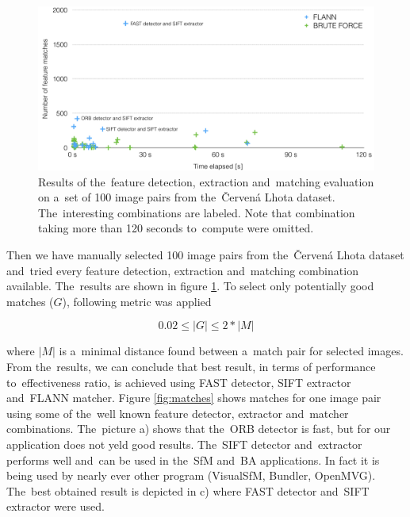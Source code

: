 \begin{figure}[!htbp]
	\begin{center}
		\includegraphics[keepaspectratio,width=\textwidth]{fig/matchers.pdf}
	\end{center}
	\caption{Results of the~feature detection, extraction and~matching evaluation on a~set of 100 image pairs from the~Červená Lhota dataset. The~interesting combinations are labeled. Note that combination taking more than 120 seconds to~compute were omitted.}
	\label{fig:matchers}
\end{figure}

Then we have manually selected 100 image pairs from the~Červená Lhota dataset and~tried every feature detection, extraction and~matching combination available. The~results are shown in figure \ref{fig:matchers}. To select only potentially good matches ($G$), following metric was applied

\begin{equation}
	0.02 \leq |G| \leq 2* |M|
\end{equation}

where $|M|$ is a~minimal distance found between a~match pair for selected images. From the~results, we can conclude that best result, in terms of performance to~effectiveness ratio, is achieved using FAST detector, SIFT extractor and~FLANN matcher. Figure \ref{fig:matches} shows matches for one image pair using some of the~well known feature detector, extractor and~matcher combinations. The~picture a) shows that the~ORB detector is fast, but for our application does not yeld good results. The~SIFT detector and~extractor performs well and~can be used in the~SfM and~BA applications. In fact it is being used by nearly ever other program (VisualSfM, Bundler, OpenMVG). The~best obtained result is depicted in c) where FAST detector and~SIFT extractor were used.

